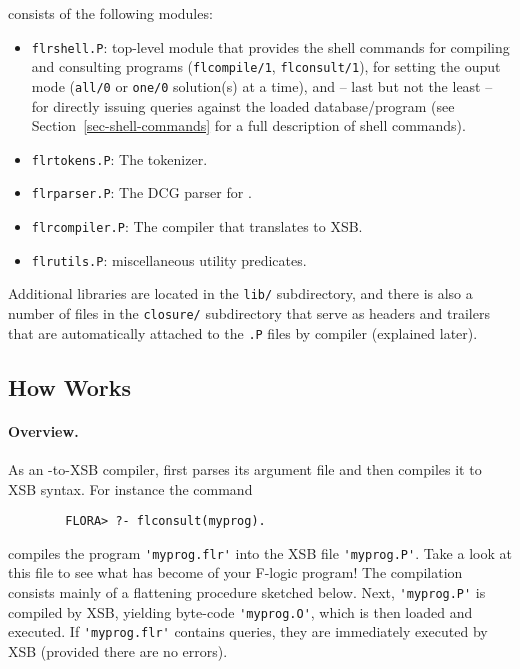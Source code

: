 \documentclass[11pt]{report}
\begin{document}
\FLORA consists of the following modules:
\begin{itemize}
\item \texttt{flrshell.P}: top-level module that provides the \FLORA shell
  commands for compiling and consulting \FLORA programs
  (\texttt{flcompile/1}, \texttt{flconsult/1}), for setting the ouput mode
  (\texttt{all/0} or \texttt{one/0} solution(s) at a time), and -- last but
  not the least -- for directly issuing queries against the loaded
  database/program (see Section~\ref{sec-shell-commands} for a full
  description of shell commands).
\item \texttt{flrtokens.P}: The \FLORA tokenizer.
\item \texttt{flrparser.P}: The DCG parser for \fl.
\item \texttt{flrcompiler.P}: The \FLORA compiler that translates \fl to XSB.
\item \texttt{flrutils.P}: miscellaneous utility predicates.
\end{itemize}
Additional libraries are located in the {\tt lib/} subdirectory, and there
is also a number of files in the {\tt closure/} subdirectory that serve as
headers and trailers that are automatically attached to the {\tt *.P} files by
\FLORA compiler (explained later).



\subsection{How \FLORA Works}



\paragraph{Overview.}

As an \fl-to-XSB compiler, \FLORA first parses its argument file and then
compiles it to XSB syntax. For instance the command
\begin{verbatim}
        FLORA> ?- flconsult(myprog).
\end{verbatim}
compiles the program \verb|'myprog.flr'| into the XSB file
\verb|'myprog.P'|.  Take a look at this file to see what has become of your
F-logic program! The compilation consists mainly of a flattening procedure
sketched below.  Next, \verb|'myprog.P'| is compiled by XSB, yielding
byte-code \verb|'myprog.O'|, which is then loaded and executed.  If
\verb|'myprog.flr'| contains queries, they are immediately executed by XSB
(provided there are no errors).
\end{document}
